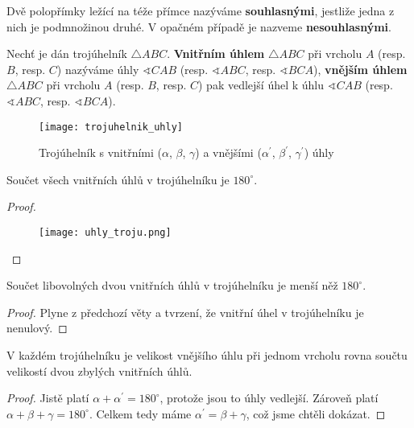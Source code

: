 \begin{definition}
  Dvě polopřímky ležící na téže přímce nazýváme \textbf{souhlasnými}, jestliže jedna z nich je podmnožinou druhé. V opačném případě je nazveme \textbf{nesouhlasnými}.
\end{definition}

\begin{definition}
  Nechť je dán trojúhelník $\triangle ABC$. \textbf{Vnitřním úhlem} $\triangle ABC$ při vrcholu $A$ (resp. $B$, resp. $C$)
  nazýváme úhly $\sphericalangle CAB$ (resp. $\sphericalangle ABC$, resp. $ \sphericalangle BCA$), \textbf{vnějším úhlem}
  $\triangle ABC$ při vrcholu $A$ (resp. $B$, resp. $C$) pak vedlejší úhel k úhlu $\sphericalangle CAB$ (resp. $\sphericalangle ABC$, resp. $\sphericalangle BCA$).
  \begin{figure}[ht!]
    \centering
    \texttt{[image: trojuhelnik\_uhly]}
    \caption{Trojúhelník s vnitřními ($\alpha$, $\beta$, $\gamma$) a
    vnějšími ($\alpha^\prime$, $\beta ^\prime$, $\gamma^\prime$) úhly}
    \label{}
  \end{figure}
\end{definition}

\begin{veta}
  Součet všech vnitřních úhlů v trojúhelníku je $180^\circ$.
\end{veta}

\begin{proof}
    \,
    \begin{figure}[h!]
      \centering
      \texttt{[image: uhly\_troju.png]}
    \end{figure}
\end{proof}


\begin{veta}
  Součet libovolných dvou vnitřních úhlů v trojúhelníku je menší něž $180^\circ$.
\end{veta}

\begin{proof}
  Plyne z předchozí věty a tvrzení, že vnitřní úhel v trojúhelníku je nenulový.
\end{proof}

\begin{veta}
  V každém trojúhelníku je velikost vnějšího úhlu při jednom vrcholu rovna součtu velikostí dvou zbylých vnitřních úhlů.
\end{veta}

\begin{proof}
  Jistě platí $\alpha + \alpha^\prime = 180^\circ$, protože jsou to úhly
  vedlejší. Zároveň platí $\alpha + \beta + \gamma = 180^\circ$. Celkem
  tedy máme $\alpha^\prime = \beta + \gamma$, což jsme chtěli dokázat.
\end{proof}

